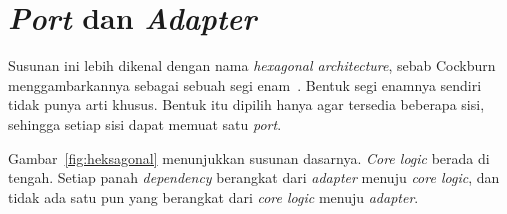 \section{\textit{Port} dan \textit{Adapter}}

Susunan ini lebih dikenal dengan nama \textit{hexagonal architecture}, sebab
Cockburn menggambarkannya sebagai sebuah segi
enam~\cite{cockburn2005hexagonal}. Bentuk segi enamnya sendiri tidak punya arti
khusus. Bentuk itu dipilih hanya agar tersedia beberapa sisi, sehingga setiap
sisi dapat memuat satu \textit{port}.

Gambar~\ref{fig:heksagonal} menunjukkan susunan dasarnya. \textit{Core logic}
berada di tengah. Setiap panah \textit{dependency} berangkat dari
\textit{adapter} menuju \textit{core logic}, dan tidak ada satu pun yang
berangkat dari \textit{core logic} menuju \textit{adapter}.

